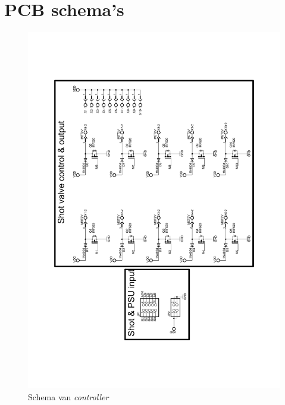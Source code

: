 \chapter{PCB schema's}
\label{app:launcher-schematic}

\begin{figure}
    \includegraphics[scale=0.5]{figures/controller_schematic.pdf}
    \caption{Schema van \emph{controller}}
\end{figure}
